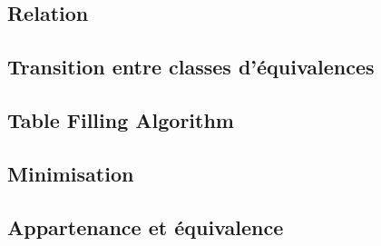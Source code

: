 \subsection{Relation \rm}
\subsection{Transition entre classes d'équivalences}
\subsection{Table Filling Algorithm}
\subsection{Minimisation}
\subsection{Appartenance et équivalence}
